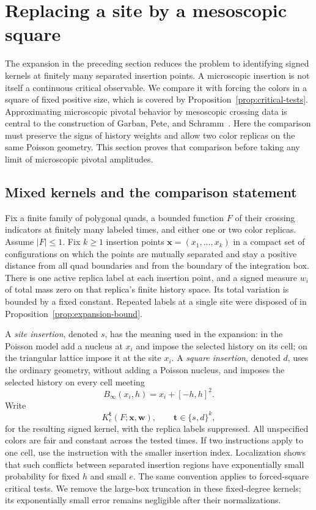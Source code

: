 \section{Replacing a site by a mesoscopic square}
\label{sec:sewing}

The expansion in the preceding section reduces the problem to identifying
signed kernels at finitely many separated insertion points.  A microscopic
insertion is not itself a continuous critical observable.  We compare it
with forcing the colors in a square of fixed positive size, which is covered
by Proposition~\ref{prop:critical-tests}.  Approximating microscopic pivotal
behavior by mesoscopic crossing data is central to the construction of
Garban, Pete, and Schramm~\cite[Section~4]{garbanpete-schramm-pivotal}.
Here the comparison must preserve the signs of history weights and allow
two color replicas on the same Poisson geometry.  This section proves that comparison before taking any
limit of microscopic pivotal amplitudes.

\subsection{Mixed kernels and the comparison statement}

Fix a finite family of polygonal quads, a bounded function $F$ of their
crossing indicators at finitely many labeled times, and either one or two
color replicas.  Assume $|F|\leq 1$.  Fix $k\geq1$ insertion points
$\boldsymbol x=(x_1,\ldots,x_k)$ in a compact set of configurations on which
the points are mutually separated and stay a positive distance from all
quad boundaries and from the boundary of the integration box.  There is
one active replica label at each insertion point, and a signed measure
$w_i$ of total mass zero on that replica's finite history space.  Its total
variation is bounded by a fixed constant.  Repeated labels at a single
site were disposed of in Proposition~\ref{prop:expansion-bound}.

A \emph{site insertion}, denoted $s$, has the meaning used in the expansion:
in the Poisson model add a nucleus at $x_i$ and impose the selected history
on its cell; on the triangular lattice impose it at the site $x_i$.
A \emph{square insertion}, denoted $d$, uses the ordinary geometry, without
adding a Poisson nucleus, and imposes the selected history on every cell
meeting
\[
 B_\infty(x_i,h)=x_i+[-h,h]^2.
\]
Write
\[
 K_e^{\boldsymbol t}(F;\boldsymbol x,\boldsymbol w),
 \qquad \boldsymbol t\in\{s,d\}^k,
\]
for the resulting signed kernel, with the replica labels suppressed.
All unspecified colors are fair and constant across the tested times.
If two instructions apply to one cell, use the instruction with the smaller
insertion index.  Localization shows that such conflicts between separated
insertion regions have exponentially small probability for fixed $h$ and
small $e$.  The same convention applies to forced-square critical tests.
We remove the large-box truncation in these fixed-degree kernels; its
exponentially small error remains negligible after their normalizations.

